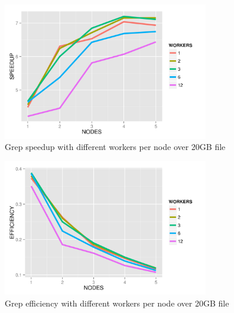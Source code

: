 \documentclass{article}
\begin{document}
    \begin{figure}[H]
        \centering
        \includegraphics[width=90mm]{images/workerPerNodeSpeedup.png}
        \caption{Grep speedup with different workers per node over 20GB file}
        \label{fig:workNodeSpeed}
    \end{figure}


    \begin{figure}[H]
        \centering
        \includegraphics[width=90mm]{images/workerPerNodeEfficiency.png}
        \caption{Grep efficiency with different workers per node over 20GB file}
        \label{fig:workNodeEff}
    \end{figure}

\end{document}
